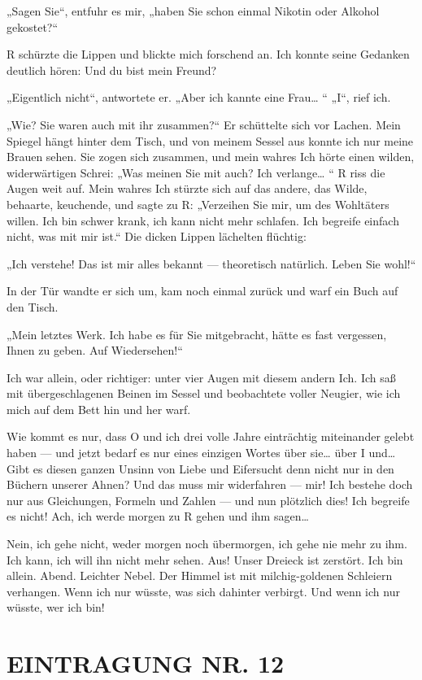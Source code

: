 „Sagen Sie“, entfuhr es mir, „haben Sie schon einmal Nikotin oder
Alkohol gekostet?“

R schürzte die Lippen und blickte mich forschend an. Ich konnte
seine Gedanken deutlich hören: Und du bist mein Freund?

„Eigentlich nicht“, antwortete er. „Aber ich kannte eine Frau\ldots{} “
„I“, rief ich.

„Wie? Sie waren auch mit ihr zusammen?“ Er schüttelte sich vor
Lachen. Mein Spiegel hängt hinter dem Tisch, und von meinem Sessel
aus konnte ich nur meine Brauen sehen. Sie zogen sich zusammen, und
mein wahres Ich hörte einen wilden, widerwärtigen Schrei: „Was
meinen Sie mit \glq{}auch\grq{}? Ich verlange\ldots{} “ R
riss die Augen weit auf. Mein wahres Ich stürzte sich auf das
andere, das Wilde, behaarte, keuchende, und sagte zu R: „Verzeihen
Sie mir, um des Wohltäters willen. Ich bin schwer krank, ich kann
nicht mehr schlafen. Ich begreife einfach nicht, was mit mir ist.“
Die dicken Lippen lächelten flüchtig:

„Ich verstehe! Das ist mir alles bekannt — theoretisch natürlich.
Leben Sie wohl!“

In der Tür wandte er sich um, kam noch einmal zurück und warf ein
Buch auf den Tisch.

„Mein letztes Werk. Ich habe es für Sie mitgebracht, hätte es fast
vergessen, Ihnen zu geben. Auf Wiedersehen!“

Ich war allein, oder richtiger: unter vier Augen mit diesem andern
Ich. Ich saß mit übergeschlagenen Beinen im Sessel und beobachtete
voller Neugier, wie ich mich auf dem Bett hin und her warf.

Wie kommt es nur, dass O und ich drei volle Jahre einträchtig
miteinander gelebt haben — und jetzt bedarf es nur eines einzigen
Wortes über sie\ldots{} über I und\ldots{} Gibt es diesen ganzen Unsinn von
Liebe und Eifersucht
denn nicht nur in den Büchern unserer Ahnen? Und das muss mir
widerfahren — mir! Ich bestehe doch nur aus Gleichungen, Formeln
und Zahlen — und nun plötzlich dies! Ich begreife es nicht! Ach,
ich werde morgen zu R gehen und ihm sagen\ldots{}

Nein, ich gehe nicht, weder morgen noch übermorgen, ich gehe nie
mehr zu ihm. Ich kann, ich will ihn nicht mehr sehen. Aus! Unser
Dreieck ist zerstört. Ich bin allein. Abend. Leichter Nebel. Der
Himmel ist mit milchig-goldenen Schleiern verhangen. Wenn ich nur
wüsste, was sich dahinter verbirgt. Und wenn ich nur wüsste, wer
ich bin!

\section{EINTRAGUNG NR. 12}

